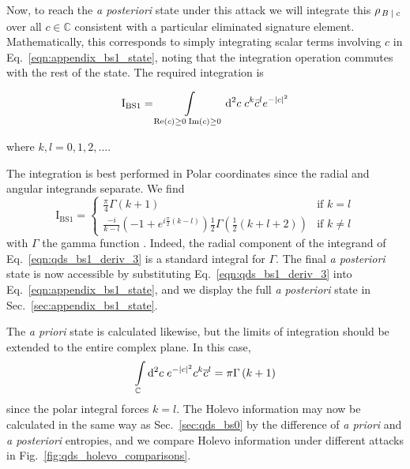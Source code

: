 Now, to reach the \emph{a posteriori} state under this attack we will integrate this $\rho_{\left. B \; \middle| \; c \right.}$ over all $c \in \mathbb{C}$ consistent with a particular eliminated signature element. Mathematically, this corresponds to simply integrating scalar terms involving $c$ in Eq.~\ref{eqn:appendix_bs1_state}, noting that the integration operation commutes with the rest of the state. The required integration is

\begin{equation}
\text{I}_{\text{BS}1} = \int\limits_{\text{Re}\left(c\right) \ge 0 \; \text{Im}\left(c\right) \ge 0} \mathop{}\!\mathrm{d^2} c \; c^k \bar{c}^l e^{ - \left| c \right|^2}
\end{equation}

\noindent where $k, l = 0, 1, 2, \dots$.

The integration is best performed in Polar coordinates since the radial and angular integrands separate. We find
\begin{equation}\label{eqn:qds_bs1_deriv_3}
\text{I}_{\text{BS}1} =
\begin{cases}
\frac{\pi}{4} \Gamma\left(k+1\right) & \text{if } k = l \\
\frac{-i}{k-l}\left(-1 + e^{i \frac{\pi}{2}\left(k-l\right)}\right)\frac{1}{2}\Gamma\left(\frac{1}{2}\left(k + l + 2\right) \right) & \text{if } k \ne l
\end{cases}
\end{equation}
with $\Gamma$ the gamma function \cite{mathworld_gamma}. Indeed, the radial component of the integrand of Eq.~\ref{eqn:qds_bs1_deriv_3} is a standard integral for $\Gamma$. The final \emph{a posteriori} state is now accessible by substituting Eq.~\ref{eqn:qds_bs1_deriv_3} into Eq.~\ref{eqn:appendix_bs1_state}, and we display the full \emph{a posteriori} state in Sec.~\ref{sec:appendix_bs1_state}.

The \emph{a priori} state is calculated likewise, but the limits of integration should be extended to the entire complex plane. In this case,
\begin{equation}\label{eqn:qds_bs1_deriv_4}
\int\limits_{\mathbb{C}} \mathop{}\!\mathrm{d^2} c \; e^{-\left|c\right|^2}c^k \overline{c}^l = \pi \Gamma\left(k+1\right)
\end{equation}
since the polar integral forces $k=l$.
The Holevo information may now be calculated in the same way as Sec.~\ref{sec:qds_bs0} by the difference of \emph{a priori} and \emph{a posteriori} entropies, and we compare Holevo information under different attacks in Fig.~\ref{fig:qds_holevo_comparisons}.

